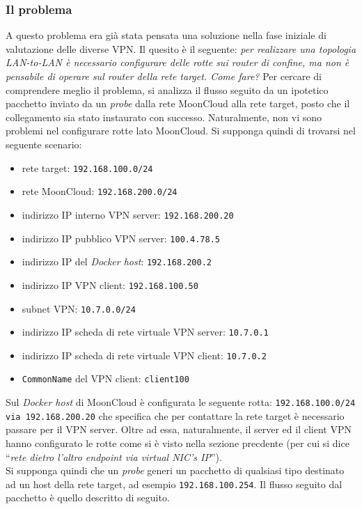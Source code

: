 \subsubsection{Il problema}
A questo problema era già stata pensata una soluzione nella fase iniziale di valutazione
delle diverse VPN. Il quesito è il seguente: \textit{per realizzare una topologia
LAN-to-LAN è necessario configurare delle rotte sui router di confine, ma non è
pensabile di operare sul router della rete target. Come fare?}
Per cercare di comprendere meglio il problema, si analizza il flusso seguito
da un ipotetico pacchetto inviato da un \textit{probe} dalla rete MoonCloud alla rete target,
posto che il collegamento sia stato instaurato con successo. Naturalmente, non vi sono
problemi nel configurare rotte lato MoonCloud. Si supponga quindi di trovarsi nel
seguente scenario:
\begin{itemize}
  \item rete target: \texttt{192.168.100.0/24}
  \item rete MoonCloud: \texttt{192.168.200.0/24}
  \item indirizzo IP interno VPN server: \texttt{192.168.200.20}
  \item indirizzo IP pubblico VPN server: \texttt{100.4.78.5}
  \item indirizzo IP del \textit{Docker host}: \texttt{192.168.200.2}
  \item indirizzo IP VPN client: \texttt{192.168.100.50}
  \item subnet VPN: \texttt{10.7.0.0/24}
  \item indirizzo IP scheda di rete virtuale VPN server: \texttt{10.7.0.1}
  \item indirizzo IP scheda di rete virtuale VPN client: \texttt{10.7.0.2}
  \item \texttt{CommonName} del VPN client: \texttt{client100}
\end{itemize}
Sul \textit{Docker host} di MoonCloud è configurata le seguente rotta:
\texttt{192.168.100.0/24 via 192.168.200.20} che specifica che per contattare la rete target
è necessario passare per il VPN server. Oltre ad essa, naturalmente, il server ed il
client VPN hanno configurato le rotte come si è visto nella sezione precdente
(per cui si dice ``\textit{rete dietro l'altro endpoint via virtual NIC's IP}'').\\
Si supponga quindi che un \textit{probe}  generi un pacchetto di qualsiasi tipo destinato
ad un host della rete target, ad esempio \texttt{192.168.100.254}.
Il flusso seguito dal pacchetto è quello descritto di seguito.
